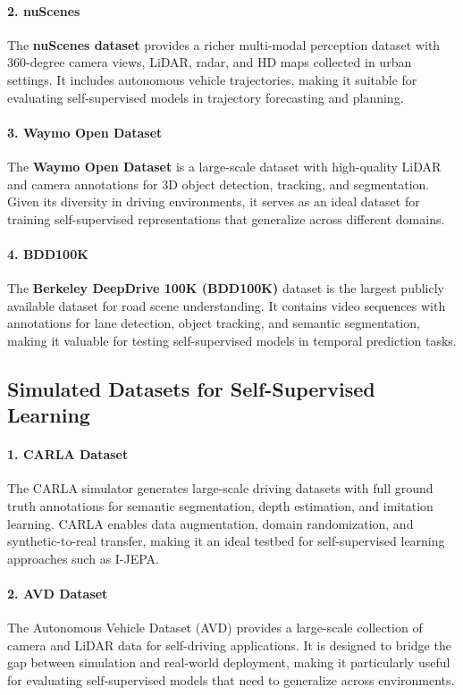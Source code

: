 \documentclass{article}
\begin{document}
\paragraph{2. nuScenes} 
The \textbf{nuScenes dataset} \citep{caesar2020nuscenes} provides a richer multi-modal perception dataset with 360-degree camera views, LiDAR, radar, and HD maps collected in urban settings. It includes autonomous vehicle trajectories, making it suitable for evaluating self-supervised models in trajectory forecasting and planning.

\paragraph{3. Waymo Open Dataset} 
The \textbf{Waymo Open Dataset} \citep{sun2020scalability} is a large-scale dataset with high-quality LiDAR and camera annotations for 3D object detection, tracking, and segmentation. Given its diversity in driving environments, it serves as an ideal dataset for training self-supervised representations that generalize across different domains.

\paragraph{4. BDD100K} 
The \textbf{Berkeley DeepDrive 100K (BDD100K)} dataset \citep{yu2020bdd100k} is the largest publicly available dataset for road scene understanding. It contains video sequences with annotations for lane detection, object tracking, and semantic segmentation, making it valuable for testing self-supervised models in temporal prediction tasks.

\subsection{Simulated Datasets for Self-Supervised Learning}

\paragraph{1. CARLA Dataset} 
The CARLA simulator \citep{dosovitskiy2017carla} generates large-scale driving datasets with full ground truth annotations for semantic segmentation, depth estimation, and imitation learning. CARLA enables data augmentation, domain randomization, and synthetic-to-real transfer, making it an ideal testbed for self-supervised learning approaches such as I-JEPA.

\paragraph{2. AVD Dataset} 
The Autonomous Vehicle Dataset (AVD) \citep{choi2021robust} provides a large-scale collection of camera and LiDAR data for self-driving applications. It is designed to bridge the gap between simulation and real-world deployment, making it particularly useful for evaluating self-supervised models that need to generalize across environments.
\end{document}

